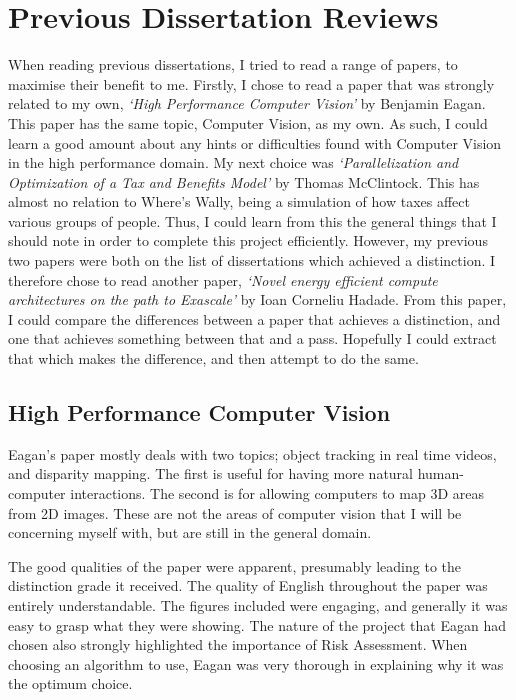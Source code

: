 \documentclass[../main.tex]{subfiles}
\begin{document}
  \section{Previous Dissertation Reviews}
    When reading previous dissertations, I tried to read a range of papers, to maximise their benefit to me.
    Firstly, I chose to read a paper that was strongly related to my own, \emph{`High Performance Computer Vision'} by Benjamin Eagan.
    This paper has the same topic,  Computer Vision, as my own.
    As such, I could learn a good amount about any hints or difficulties found with Computer Vision in the high performance domain.
    My next choice was \emph{`Parallelization and Optimization of a Tax and Benefits Model'} by Thomas McClintock. 
    This has almost no relation to Where's Wally, being a simulation of how taxes affect various groups of people.
    Thus, I could learn from this the general things that I should note in order to complete this project efficiently.
    However, my previous two papers were both on the list of dissertations which achieved a distinction.
    I therefore chose to read another paper, \emph{`Novel energy efficient compute architectures on the path to Exascale'} by Ioan Corneliu Hadade.
    From this paper, I could compare the differences between a paper that achieves a distinction, and one that achieves something between that and a pass.
    Hopefully I could extract that which makes the difference, and then attempt to do the same.
  \subsection{High Performance Computer Vision}
    Eagan's paper mostly deals with two topics; object tracking in real time videos, and disparity mapping.
    The first is useful for having more natural human-computer interactions.
    The second is for allowing computers to map 3D areas from 2D images.
    These are not the areas of computer vision that I will be concerning myself with, but are still in the general domain.
    
    The good qualities of the paper were apparent, presumably leading to the distinction grade it received.
    The quality of English throughout the paper was entirely understandable.
    The figures included were engaging, and generally it was easy to grasp what they were showing.
    The nature of the project that Eagan had chosen also strongly highlighted the importance of Risk Assessment.
    When choosing an algorithm to use, Eagan was very thorough in explaining why it was the optimum choice.
\end{document}
